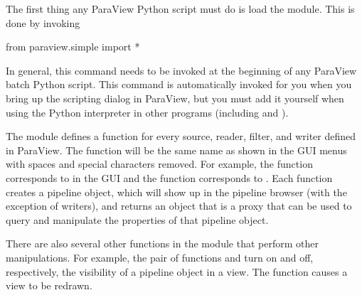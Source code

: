 The first thing any ParaView Python script must do is load the
 module.  This is done by invoking
\begin{python}
from paraview.simple import *
\end{python}
In general, this command needs to be invoked at the beginning of any
ParaView batch Python script.  This command is automatically invoked for
you when you bring up the scripting dialog in ParaView, but you must add it
yourself when using the Python interpreter in other programs (including
 and ).

The  module defines a function for every source,
reader, filter, and writer defined in ParaView.  The function will be the
same name as shown in the GUI menus with spaces and special characters
removed.  For example, the  function corresponds to
 \ra {} in the GUI and the 
function corresponds to  \ra {} \ra {}.  Each function creates a pipeline object, which will show up
in the pipeline browser (with the exception of writers), and returns an
object that is a proxy that can be used to query and manipulate the
properties of that pipeline object.

There are also several other functions in the 
module that perform other manipulations.  For example, the pair of
functions  and  turn on and off, respectively,
the visibility of a pipeline object in a view.  The 
function causes a view to be redrawn.

